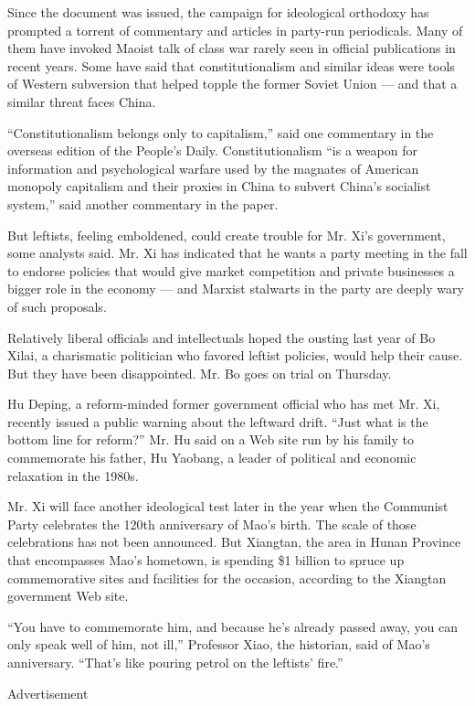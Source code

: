 Since the document was issued, the campaign for ideological orthodoxy
has prompted a torrent of commentary and articles in party-run
periodicals. Many of them have invoked Maoist talk of class war rarely
seen in official publications in recent years. Some have said that
constitutionalism and similar ideas were tools of Western subversion
that helped topple the former Soviet Union --- and that a similar threat
faces China.

``Constitutionalism belongs only to capitalism,'' said one commentary in
the overseas edition of the People's Daily. Constitutionalism ``is a
weapon for information and psychological warfare used by the magnates of
American monopoly capitalism and their proxies in China to subvert
China's socialist system,'' said another commentary in the paper.

But leftists, feeling emboldened, could create trouble for Mr. Xi's
government, some analysts said. Mr. Xi has indicated that he wants a
party meeting in the fall to endorse policies that would give market
competition and private businesses a bigger role in the economy --- and
Marxist stalwarts in the party are deeply wary of such proposals.

Relatively liberal officials and intellectuals hoped the ousting last
year of Bo Xilai, a charismatic politician who favored leftist policies,
would help their cause. But they have been disappointed. Mr. Bo goes on
trial on Thursday.

Hu Deping, a reform-minded former government official who has met Mr.
Xi, recently issued a public warning about the leftward drift. ``Just
what is the bottom line for reform?'' Mr. Hu said on a Web site run by
his family to commemorate his father, Hu Yaobang, a leader of political
and economic relaxation in the 1980s.

Mr. Xi will face another ideological test later in the year when the
Communist Party celebrates the 120th anniversary of Mao's birth. The
scale of those celebrations has not been announced. But Xiangtan, the
area in Hunan Province that encompasses Mao's hometown, is spending \$1
billion to spruce up commemorative sites and facilities for the
occasion, according to the Xiangtan government Web site.

``You have to commemorate him, and because he's already passed away, you
can only speak well of him, not ill,'' Professor Xiao, the historian,
said of Mao's anniversary. ``That's like pouring petrol on the leftists'
fire.''

Advertisement

